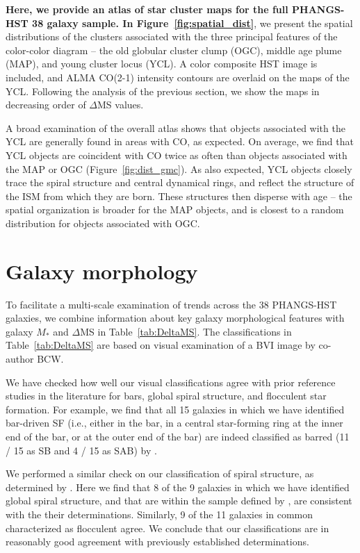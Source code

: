 \documentclass[linenumbers]{aastex63}
\begin{document}
\textbf{Here, we provide an atlas of star cluster maps for the full PHANGS-HST 38 galaxy sample.  In Figure~\ref{fig:spatial_dist}}, we present the spatial distributions of the clusters associated with the three principal features of the color-color diagram -- the old globular cluster clump (OGC), middle age plume (MAP), and young cluster locus (YCL).  A color composite HST image is included, and ALMA CO(2-1) intensity contours are overlaid on the maps of the YCL. Following the analysis of the previous section, we show the maps in decreasing order of $\Delta$MS values.   

A broad examination of the overall atlas shows that objects associated with the YCL are generally found in areas with CO, as expected. On average, we find that YCL objects are coincident with CO twice as often than objects associated with the MAP or OGC (Figure~\ref{fig:dist_gmc}).   As also expected, YCL objects closely trace the spiral structure and central dynamical rings, and reflect the structure of the ISM from which they are born.  These structures then disperse with age -- the spatial organization is broader for the MAP objects, and is closest to a random distribution for objects associated with OGC.



\section{Galaxy morphology}
To facilitate a multi-scale examination of trends across the 38 PHANGS-HST galaxies, we combine information about key galaxy morphological features with galaxy $M_*$ and $\Delta$MS in Table~\ref{tab:DeltaMS}. The classifications in Table~\ref{tab:DeltaMS} are based on visual examination of a BVI image by co-author BCW. 

We have checked how well our visual classifications agree with prior reference studies in the literature for bars, global spiral structure, and flocculent star formation. For example, we find that all 15 galaxies in which we have identified 
bar-driven SF (i.e., either in the bar, in a central star-forming ring at the inner end of the bar, or at the outer end of the bar) are indeed classified as barred (11 / 15 as SB and 4 / 15 as SAB) by \citet{buta15}. 


We performed a similar check on our classification of spiral structure, as determined by \citet{EE87}. Here we find that 8 of the 9 galaxies in which we have identified global spiral structure, and that are within the sample defined by \citet{EE87}, are consistent with the their determinations. Similarly, 9 of the 11 galaxies in common characterized as flocculent agree. We conclude that our classifications are in reasonably good agreement with previously established determinations.
\end{document}
